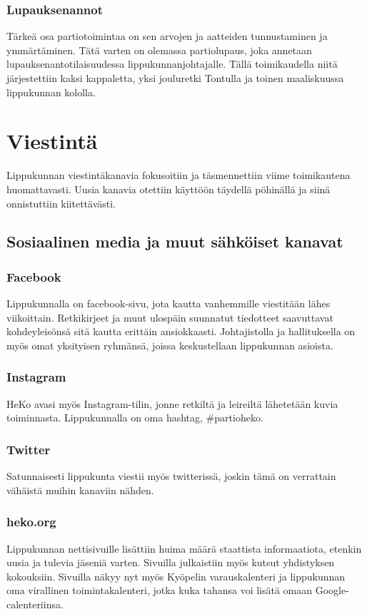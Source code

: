 \documentclass[a4paper, 12pt, finnish]{report} %
\begin{document}
\subsubsection{Lupauksenannot}
Tärkeä osa partiotoimintaa on sen arvojen ja aatteiden tunnustaminen ja ymmärtäminen. Tätä varten on olemassa partiolupaus, joka annetaan lupauksenantotilaisuudessa lippukunnanjohtajalle. Tällä toimikaudella niitä järjestettiin kaksi kappaletta, yksi jouluretki Tontulla ja toinen maaliskuussa lippukunnan kololla.
\newpage
\section{Viestintä}
Lippukunnan viestintäkanavia fokusoitiin ja täsmennettiin viime toimikautena huomattavasti. Uusia kanavia otettiin käyttöön täydellä pöhinällä ja siinä onnistuttiin kiitettävästi.
\subsection{Sosiaalinen media ja muut sähköiset kanavat}
\subsubsection{Facebook}
Lippukunnalla on facebook-sivu, jota kautta vanhemmille viestitään lähes viikoittain. Retkikirjeet ja muut ulospäin suunnatut tiedotteet saavuttavat kohdeyleisönsä sitä kautta erittäin ansiokkaasti. Johtajistolla ja hallituksella on myös omat yksityisen ryhmänsä, joissa keskustellaan lippukunnan asioista.
\subsubsection{Instagram}
HeKo avasi myös Instagram-tilin, jonne retkiltä ja leireiltä lähetetään kuvia toiminnasta. Lippukunnalla on oma hashtag, \#partioheko.
\subsubsection{Twitter}
Satunnaisesti lippukunta viestii myös twitterissä, joskin tämä on verrattain vähäistä muihin kanaviin nähden.
\subsubsection{heko.org}
Lippukunnan nettisivuille lisättiin huima määrä staattista informaatiota, etenkin uusia ja tulevia jäseniä varten. Sivuilla julkaistiin myös kutsut yhdistyksen kokouksiin. Sivuilla näkyy nyt myös Kyöpelin varauskalenteri ja lippukunnan oma virallinen toimintakalenteri, jotka kuka tahansa voi lisätä omaan Google-calenteriinsa.
\end{document}

